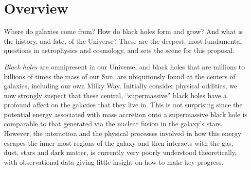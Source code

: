 \documentclass[oneside, a4paper, onecolumn, 11pt]{article}
\begin{document}


\smallskip
\smallskip
\noindent
\section{\textcolor{Cerulean}{Overview}}
Where do galaxies come from? How do black holes form and grow? And
what is the history, and fate, of the Universe?  These are the
deepest, most fundamental questions in astrophysics and cosmology, and
sets the scene for this proposal.

\smallskip
\smallskip
\noindent
{\it Black holes} are omnipresent in our Universe, and black holes that are
millions to billions of times the mass of our Sun, are ubiquitously
found at the centers of galaxies, including our own Milky Way.
Initially consider physical oddities, we now strongly suspect that
these central, ``supermassive'' black holes have a profound
affect on the galaxies that they live in. This is not surprising since
the potential energy associated with mass accretion onto a
supermassive black hole is comparable to that generated via the
nuclear fusion in the galaxy's stars.
However, the interaction and the physical processes involved in how
this energy escapes the inner most regions of the galaxy and then
interacts with the gas, dust, stars and dark matter, is currently very
poorly understood theoretically, with observational data giving little 
insight on how to make key progress.
\end{document}
